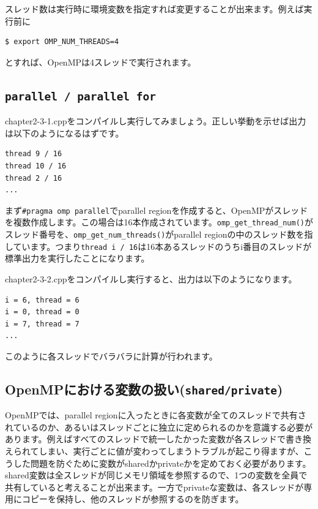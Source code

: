 \documentclass[12pt]{jreport}
\begin{document}
スレッド数は実行時に環境変数を指定すれば変更することが出来ます。例えば実行前に
\begin{lstlisting}[style=terminal]
  $ export OMP_NUM_THREADS=4
\end{lstlisting}
とすれば、OpenMPは4スレッドで実行されます。

\subsection{\texttt{parallel / parallel for}}
chapter2-3-1.cppをコンパイルし実行してみましょう。正しい挙動を示せば出力は以下のようになるはずです。

\begin{lstlisting}[style=terminal]
thread 9 / 16
thread 10 / 16
thread 2 / 16
...
\end{lstlisting}

まず\texttt{\#pragma omp parallel}でparallel regionを作成すると、OpenMPがスレッドを複数作成します。この場合は16本作成されています。\texttt{omp_get_thread_num()}がスレッド番号を、\texttt{omp_get_num_threads()}がparallel regionの中のスレッド数を指しています。つまり\texttt{thread i / 16}は16本あるスレッドのうちi番目のスレッドが標準出力を実行したことになります。

chapter2-3-2.cppをコンパイルし実行すると、出力は以下のようになります。
\begin{lstlisting}[style=terminal]
i = 6, thread = 6
i = 0, thread = 0
i = 7, thread = 7
...
\end{lstlisting}
このように各スレッドでバラバラに計算が行われます。

\subsection{OpenMPにおける変数の扱い(\texttt{shared/private})}
OpenMPでは、parallel regionに入ったときに各変数が全てのスレッドで共有されているのか、あるいはスレッドごとに独立に定められるのかを意識する必要があります。例えばすべてのスレッドで統一したかった変数が各スレッドで書き換えられてしまい、実行ごとに値が変わってしまうトラブルが起こり得ますが、こうした問題を防ぐために変数がsharedかprivateかを定めておく必要があります。shared変数は全スレッドが同じメモリ領域を参照するので、1つの変数を全員で共有していると考えることが出来ます。一方でprivateな変数は、各スレッドが専用にコピーを保持し、他のスレッドが参照するのを防ぎます。
\end{document}
